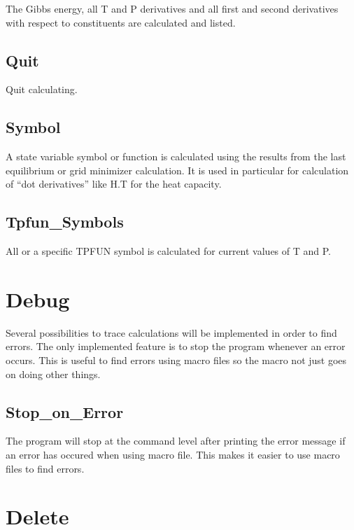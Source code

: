 \documentclass[12pt]{article}
\begin{document}
The Gibbs energy, all T and P derivatives and all first and second
derivatives with respect to constituents are calculated and listed.

\subsection{Quit}

Quit calculating.

\subsection{Symbol}

A state variable symbol or function is calculated using the results
from the last equilibrium or grid minimizer calculation.  It is used
in particular for calculation of ``dot derivatives'' like H.T for the
heat capacity.

\subsection{Tpfun\_Symbols}

All or a specific TPFUN symbol is calculated for current values of T
and P.

\section{Debug }

Several possibilities to trace calculations will be implemented in
order to find errors.  The only implemented feature is to stop the
program whenever an error occurs.  This is useful to find errors using
macro files so the macro not just goes on doing other things.

\subsection{Stop\_on\_Error}

The program will stop at the command level after printing the error
message if an error has occured when using macro file.  This makes it
easier to use macro files to find errors.

\section{Delete }
\end{document}
